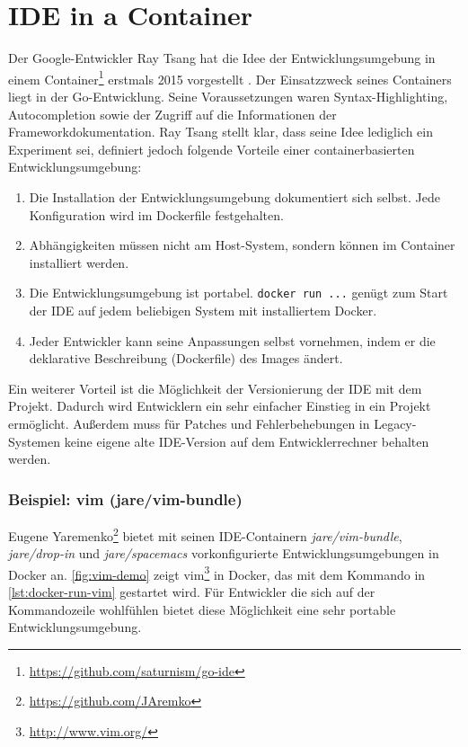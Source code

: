 \section{IDE in a Container}
\label{sec:ideinacontainer}
Der Google-Entwickler Ray Tsang hat die Idee der Entwicklungsumgebung in einem Container\footnote{\url{https://github.com/saturnism/go-ide}} erstmals 2015 vorgestellt \autocite{go-ide-in-a-container:online}.
Der Einsatzzweck seines Containers liegt in der Go-Entwicklung.
Seine Voraussetzungen waren Syntax-Highlighting, Autocompletion sowie der Zugriff auf die Informationen der Frameworkdokumentation.
Ray Tsang stellt klar, dass seine Idee lediglich ein Experiment sei, definiert jedoch folgende Vorteile einer containerbasierten Entwicklungsumgebung:
\begin{enumerate}
    \item Die Installation der Entwicklungsumgebung dokumentiert sich selbst. Jede Konfiguration wird im Dockerfile festgehalten.
    \item Abhängigkeiten müssen nicht am Host-System, sondern können im Container installiert werden.
    \item Die Entwicklungsumgebung ist portabel. \texttt{docker run ...} genügt zum Start der IDE auf jedem beliebigen System mit installiertem Docker.
    \item Jeder Entwickler kann seine Anpassungen selbst vornehmen, indem er die deklarative Beschreibung (Dockerfile) des Images ändert.
\end{enumerate}
Ein weiterer Vorteil ist die Möglichkeit der Versionierung der IDE mit dem Projekt.
Dadurch wird Entwicklern ein sehr einfacher Einstieg in ein Projekt ermöglicht.
Außerdem muss für Patches und Fehlerbehebungen in Legacy-Systemen keine eigene alte IDE-Version auf dem Entwicklerrechner behalten werden.

\subsubsection{Beispiel: vim (jare/vim-bundle)}
Eugene Yaremenko\footnote{\url{https://github.com/JAremko}} bietet mit seinen IDE-Containern \emph{jare/vim-bundle}, \emph{jare/drop-in} und \emph{jare/spacemacs} vorkonfigurierte Entwicklungsumgebungen in Docker an.
\cref{fig:vim-demo} zeigt vim\footnote{\url{http://www.vim.org/}} in Docker, das mit dem Kommando in \cref{lst:docker-run-vim} gestartet wird.
Für Entwickler die sich auf der Kommandozeile wohlfühlen bietet diese Möglichkeit eine sehr portable Entwicklungsumgebung.

